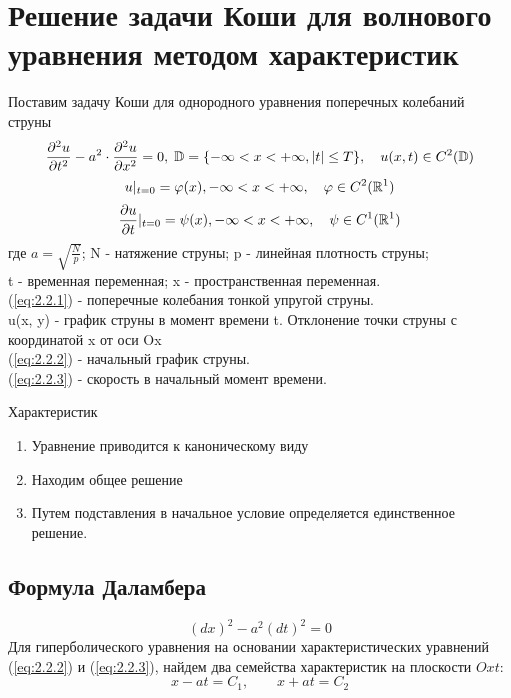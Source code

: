 \documentclass[../main.tex]{subfiles}
\begin{document}
\section{Решение задачи Коши для волнового уравнения методом характеристик}
Поставим задачу Коши для однородного уравнения поперечных колебаний струны
\begin{equation}
	\label{eq:2.2.1}
	\frac{\partial^2u}{\partial t^2}-a^2 \cdot \frac{\partial^2u}{\partial x^2}=0, \;
	\mathbb{D}=\lbrace- \infty<x<+\infty, |t|\leq T \rbrace, \quad
	u(x,t) \in C^2(\mathbb{D})
\end{equation}
\begin{equation}
	\label{eq:2.2.2}
	u|_{t=0} = \varphi(x), -\infty<x<+\infty, \quad \varphi \in C^2(\mathbb{R}^1)
\end{equation}
\begin{equation}
	\label{eq:2.2.3}
	\frac{\partial u}{\partial t}|_{t=0} = \psi(x),  -\infty<x<+\infty, \quad \psi \in C^1(\mathbb{R}^1)
\end{equation}
где $a=\sqrt{\frac{N}{p}}$; \quad N - натяжение струны; \quad p - линейная плотность струны;\\
t - временная переменная; \quad x - пространственная переменная.\\
(\ref{eq:2.2.1}) - поперечные колебания тонкой упругой струны.\\
u(x, y) - график струны в момент времени t. Отклонение точки струны с координатой x от оси Ox\\
(\ref{eq:2.2.2}) - начальный график струны.\\
(\ref{eq:2.2.3}) - скорость в начальный момент времени.\\
\begin{center}
	{ Характеристик}\\
	\begin{enumerate}
		\item
		      Уравнение приводится к каноническому виду
		\item
		      Находим общее решение
		\item
		      Путем подставления в начальное условие определяется единственное решение.
	\end{enumerate}
\end{center}

\subsection{Формула Даламбера}
\begin{equation*}
	(dx)^2-a^2(dt)^2=0
\end{equation*}
Для гиперболического уравнения на основании характеристических уравнений (\ref{eq:2.2.2}) и (\ref{eq:2.2.3}),
найдем два семейства характеристик на плоскости $Oxt$:
\[x-at=C_1, \qquad  x+at=C_2\]
\end{document}
